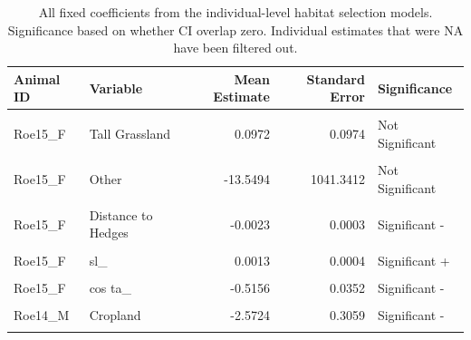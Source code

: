\documentclass[10pt,a4paper]{article}
\begin{document}
\begingroup\fontsize{9}{11}\selectfont

\begin{longtable}[t]{llrrl}
\caption{\label{tab:sffTable}All fixed coefficients from the individual-level habitat selection models. Significance based on whether CI overlap zero. Individual estimates that were NA have been filtered out.}\\
\toprule
Animal ID & Variable & Mean Estimate & Standard Error & Significance\\
\midrule
\cellcolor{gray!10}{Roe15\_F} & \cellcolor{gray!10}{Cropland} & \cellcolor{gray!10}{0.4000} & \cellcolor{gray!10}{0.1210} & \cellcolor{gray!10}{Significant +}\\
Roe15\_F & Tall Grassland & 0.0972 & 0.0974 & Not Significant\\
\cellcolor{gray!10}{Roe15\_F} & \cellcolor{gray!10}{Permanent Wetland} & \cellcolor{gray!10}{-13.9209} & \cellcolor{gray!10}{2064.3382} & \cellcolor{gray!10}{Not Significant}\\
Roe15\_F & Other & -13.5494 & 1041.3412 & Not Significant\\
\cellcolor{gray!10}{Roe15\_F} & \cellcolor{gray!10}{Distance to Woodland} & \cellcolor{gray!10}{-0.0115} & \cellcolor{gray!10}{0.0015} & \cellcolor{gray!10}{Significant -}\\
\addlinespace
Roe15\_F & Distance to Hedges & -0.0023 & 0.0003 & Significant -\\
\cellcolor{gray!10}{Roe15\_F} & \cellcolor{gray!10}{Road Crossing} & \cellcolor{gray!10}{-1.3295} & \cellcolor{gray!10}{0.2040} & \cellcolor{gray!10}{Significant -}\\
Roe15\_F & sl\_ & 0.0013 & 0.0004 & Significant +\\
\cellcolor{gray!10}{Roe15\_F} & \cellcolor{gray!10}{log sl\_} & \cellcolor{gray!10}{-0.0273} & \cellcolor{gray!10}{0.0425} & \cellcolor{gray!10}{Not Significant}\\
Roe15\_F & cos ta\_ & -0.5156 & 0.0352 & Significant -\\
\addlinespace
\cellcolor{gray!10}{Roe14\_M} & \cellcolor{gray!10}{Evergreen Needleleaf Forest} & \cellcolor{gray!10}{-0.3566} & \cellcolor{gray!10}{0.1422} & \cellcolor{gray!10}{Significant -}\\
Roe14\_M & Cropland & -2.5724 & 0.3059 & Significant -\\
\cellcolor{gray!10}{Roe14\_M} & \cellcolor{gray!10}{Tall Grassland} & \cellcolor{gray!10}{-1.1536} & \cellcolor{gray!10}{0.1202} & \cellcolor{gray!10}{Significant -}\\

\end{longtable}
\end{document}
